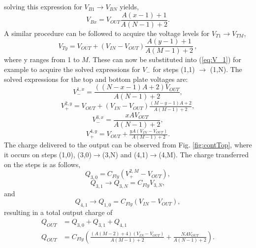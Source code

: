 \documentclass[conference]{IEEEtran}
\begin{document}
	solving this expression for $V_{B1} \rightarrow V_{BN}$ yields,
	\begin{equation}
	V_{Bx} = V_{OUT}\frac{A(x-1) + 1}{A(N-1) + 2}.
	\end{equation}
	A similar procedure can be followed to acquire the voltage levels for $V_{T1} \rightarrow V_{TM}$,
	\begin{equation}
	V_{Ty} = V_{OUT} + (V_{IN} - V_{OUT})\frac{A(y-1) + 1}{A(M-1) + 2}\,,
	\end{equation}
	where y ranges from 1 to $M$.
	These can now be substituted into (\ref{eq:V_1}) for example to acquire the solved expressions for $V_-$ for steps (1,1) $\rightarrow$ (1,N).
	The solved expressions for the top and bottom plate voltages are:
	\begin{equation}
	V_{-}^{1,x} = \frac{((N-x-1)A + 2)V_{OUT}}{A(N-1) + 2},
	\end{equation}
	\begin{equation}
	V_{+}^{2,y} = V_{OUT} + (V_{IN} -V_{OUT})\tfrac{(M-y-1)A + 2}{A(M-1) + 2},
	\end{equation}
	\begin{equation}
	V_{-}^{3,x} = \frac{xAV_{OUT}}{A(N-1) + 2},
	\end{equation}
	\begin{equation}
	V_{+}^{4,y} = V_{OUT} + \tfrac{yA(V_{IN} -V_{OUT})}{A(M-1) + 2}.
	\end{equation}
	The charge delivered to the output can be observed from Fig. \ref{fig:contTop}, where it occurs on steps (1,0), (3,0)$\rightarrow$(3,N) and (4,1)$\rightarrow$(4,M). The charge transferred on the steps is as follows,
	\begin{equation}
	Q_{3,0} = C_{Fly}(V_+^{2,M} - V_{OUT}),
	\end{equation}
	\begin{equation}
	Q_{3,1} \rightarrow  Q_{3,N} = C_{Fly}V_{3,N},
	\end{equation}
	and
	\begin{equation}
	Q_{4,1} \rightarrow  Q_{1,0} = C_{Fly}(V_{IN} - V_{OUT}),
	\end{equation}
	resulting in a total output charge of 
	\begin{equation}
	\begin{split}
	Q_{OUT}\! &= Q_{3,0} + Q_{3,1} + Q_{4,1}\\
	Q_{OUT}\! &= \! C_{Fly}\!\left(\tfrac{(A(M-2) + 4)(V_{IN} - V_{OUT})}{A(M-1) + 2}\! + \! \tfrac{NAV_{OUT}}{A(N-1) + 2}\right).
	\end{split}
 	\end{equation}
\end{document}
